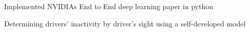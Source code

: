 \documentclass[]{deedy-resume-openfont}
\begin{document}
\begin{minipage}[t]{0.66\textwidth}
\begin{tightemize}
\item Implemented NVIDIAs End to End deep learning paper in python\\
\item Determining drivers' inactivity by driver's sight using a self-developed model\\
\end{tightemize}








\end{minipage} 
\end{document}

